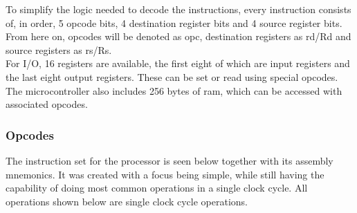 To simplify the logic needed to decode the instructions, every instruction consists of, in order, 5 opcode bits,
4 destination register bits and 4 source register bits. From here on, opcodes will be denoted as opc, destination registers as
rd/Rd and source registers as rs/Rs. \\

For I/O, 16 registers are available, the first eight of which are input registers and the last eight output registers.
These can be set or read using special opcodes.\\

The microcontroller also includes 256 bytes of ram, which can be accessed with associated opcodes.

\subsubsection{Opcodes}
The instruction set for the processor is seen below together with its assembly mnemonics. It was created
with a focus being simple, while still having the capability of doing most common operations
in a single clock cycle. All operations shown below are single clock cycle operations.
 
